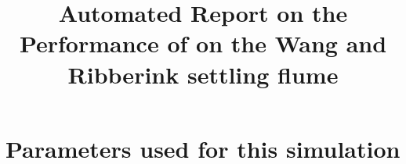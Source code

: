 \documentclass[11pt,a4paper]{article}%
\begin{document}
 

\title{Automated Report on the Performance of \anuga{} on the Wang and Ribberink settling flume}
\maketitle




\section{Parameters used for this simulation}






\end{document}
